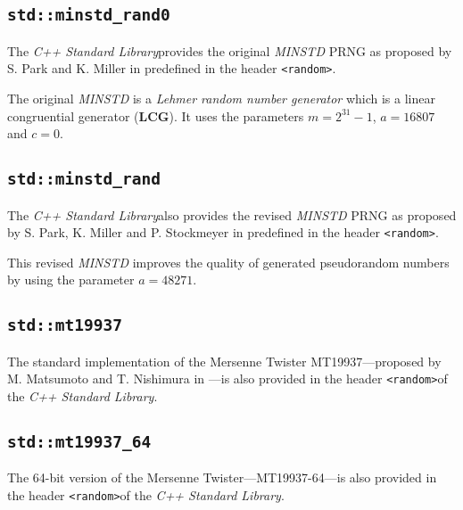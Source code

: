 \subsection[\lstinline{std::minstd_rand0}]{\lstinline{std::minstd_rand0}} \label{subsec:minstd_rand0}

	The \textit{C++ Standard Library}\footnotemark[1] provides the original \textit{MINSTD} PRNG as proposed by S. Park and K. Miller in \cite{Park:1988} predefined in the header \lstinline{<random>}\footnotemark[2].
	
	The original \textit{MINSTD} is a \emph{Lehmer random number generator} which is a linear congruential generator (\textbf{LCG}). It uses the parameters $m = 2^31 - 1$, $a = 16807$ and $c = 0$.

\subsection[\lstinline{std::minstd_rand}]{\lstinline{std::minstd_rand}} \label{subsec:minstd_rand}

	The \textit{C++ Standard Library}\footnotemark[1] also provides the revised \textit{MINSTD} PRNG as proposed by S. Park, K. Miller and P. Stockmeyer in \cite{Park:1993} predefined in the header \lstinline{<random>}\footnotemark[2].
	
	This revised \textit{MINSTD} improves the quality of generated pseudorandom numbers by using the parameter $a = 48271$.

\subsection[\lstinline{std::mt19937}]{\lstinline{std::mt19937}} \label{subsec:mt19937}

	The standard implementation of the Mersenne Twister MT19937---proposed by M. Matsumoto and T. Nishimura in \cite{Matsumoto:1998}---is also provided in the header \lstinline{<random>}\footnotemark[2] of the \textit{C++ Standard Library}\footnotemark[1].

\subsection[\lstinline{std::mt19937_64}]{\lstinline{std::mt19937_64}} \label{subsec:mt19937_64}

	The 64-bit version of the Mersenne Twister---MT19937-64---is also provided in the header \lstinline{<random>}\footnotemark[2] of the \textit{C++ Standard Library}\footnotemark[1].

